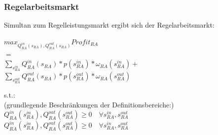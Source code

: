 \subsubsection{Regelarbeitsmarkt}
Simultan zum Regelleistungsmarkt ergibt sich der Regelarbeitsmarkt:
\begin{center}
	$max_{Q^{in}_{RA}(s_{RA}), Q^{out}_{RA}(s_{RA})} Profit_{RA}$\\
	$=$\\
	$\sum_{s^{in}_{RA}} Q^{in}_{RA}(s_{RA}) * p(s^{in}_{RA}) * \omega_{RA}(s^{in}_{RA}) +$\\
	$\sum_{s^{out}_{RA}} Q^{out}_{RA}(s_{RA}) * p(s^{out}_{RA}) * \omega_{RA}(s^{out}_{RA})$\\
\end{center}
s.t.:\\
(grundlegende Beschränkungen der Definitionsbereiche:)\\
$Q^{in}_{RA}(s^{in}_{RA}),Q^{out}_{RA}(s^{out}_{RA}) \geq 0 \quad\forall s^{in}_{RA},s^{out}_{RA} $\\
$Q^{in}_{RA}(s^{in}_{RA}),Q^{out}_{RA}(s^{out}_{RA}) \geq 0\quad\forall  s^{in}_{RA},s^{out}_{RA} $\\


